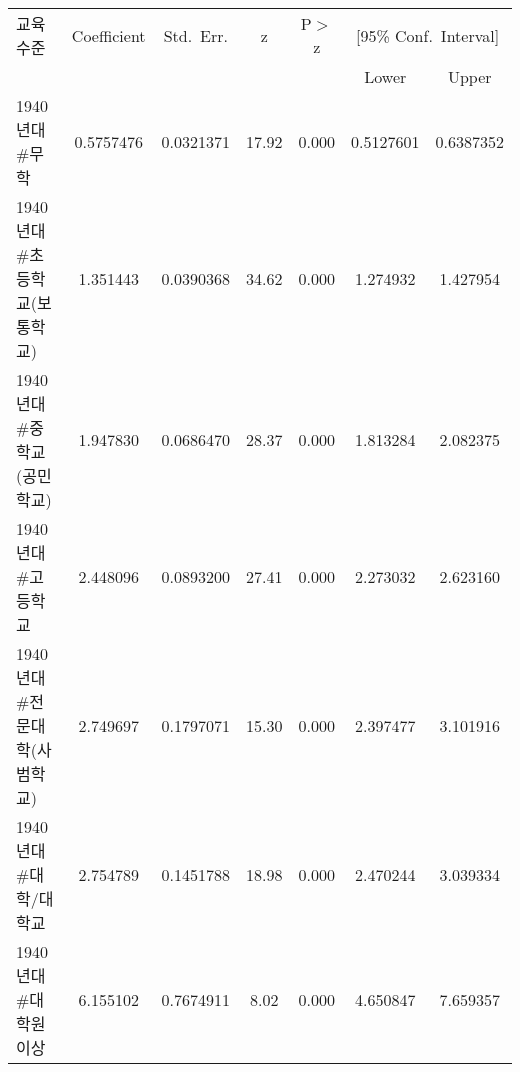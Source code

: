 \begin{tabular}{lcccccc}
\toprule
교육 수준 & Coefficient & Std.~Err. & z & P$>$z & \multicolumn{2}{c}{[95\% Conf.~Interval]} \\
\cmidrule(lr){6-7}
 &  &  &  &  & Lower & Upper \\
\midrule
1940년대\#무학 & 0.5757476 & 0.0321371 & 17.92 & 0.000 & 0.5127601 & 0.6387352 \\
1940년대\#초등학교(보통학교) & 1.351443 & 0.0390368 & 34.62 & 0.000 & 1.274932 & 1.427954 \\
1940년대\#중학교(공민학교) & 1.947830 & 0.0686470 & 28.37 & 0.000 & 1.813284 & 2.082375 \\
1940년대\#고등학교 & 2.448096 & 0.0893200 & 27.41 & 0.000 & 2.273032 & 2.623160 \\
1940년대\#전문대학(사범학교) & 2.749697 & 0.1797071 & 15.30 & 0.000 & 2.397477 & 3.101916 \\
1940년대\#대학/대학교 & 2.754789 & 0.1451788 & 18.98 & 0.000 & 2.470244 & 3.039334 \\
1940년대\#대학원 이상 & 6.155102 & 0.7674911 & 8.02  & 0.000 & 4.650847 & 7.659357 \\
\bottomrule
\end{tabular}
